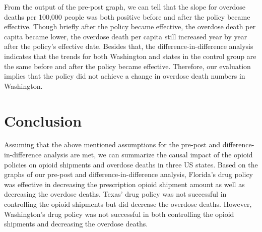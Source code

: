 \documentclass[12pt,letterpaper]{article}
\begin{document}
From the output of the pre-post graph, we can tell that the slope for overdose deaths per 100,000 people was both positive before and after the policy became effective. Though briefly after the policy became effective, the overdose death per capita became lower, the overdose death per capita still increased year by year after the policy's effective date. Besides that, the difference-in-difference analysis indicates that the trends for both Washington and states in the control group are the same before and after the policy became effective. Therefore, our evaluation implies that the policy did not achieve a change in overdose death numbers in Washington.


\section{Conclusion}

Assuming that the above mentioned assumptions for the pre-post and difference-in-difference analysis are met, we can summarize the causal impact of the opioid policies on opioid shipments and overdose deaths in three US states. Based on the graphs of our pre-post and difference-in-difference analysis, Florida's drug policy was effective in decreasing the prescription opioid shipment amount as well as decreasing the overdose deaths. Texas' drug policy was not successful in controlling the opioid shipments but did decrease the overdose deaths. However, Washington's drug policy was not successful in both controlling the opioid shipments and decreasing the overdose deaths.
\end{document}
